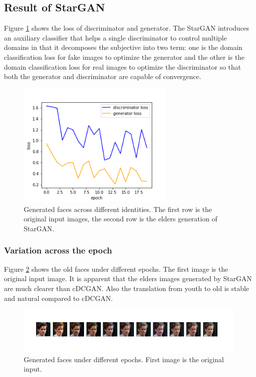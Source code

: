 \documentclass{article}
\begin{document}
\subsection{Result of StarGAN}

Figure \ref{stargan_loss} shows the loss of discriminator and generator. The StarGAN \cite{DBLP:journals/corr/abs-1711-09020} introduces an auxiliary classifier that helps a single discriminator to control multiple domains in that it decomposes the subjective into two term: one is the domain classification loss for fake images to optimize the generator and the other is the domain classification loss for real images to optimize the discriminator so that both the generator and discriminator are capable of convergence.

\begin{figure}[H]
\begin{center}
  \centering
  \includegraphics[width=3in]{image/stargan_loss.png}
\end{center}
\caption{Generated faces across different identities. The first row is the original input images, the second row is the elders generation of StarGAN.}
\label{stargan_loss}
\end{figure}

\subsubsection{Variation across the epoch}

Figure \ref{stargan_same_identity} shows the old faces under different epochs. The first image is the original input image. It is apparent that the elders images generated by StarGAN are much clearer than cDCGAN. Also the translation from youth to old is stable and natural compared to cDCGAN.

\begin{figure}[H]
\begin{center}
  \centering
  \includegraphics[width=6in]{image/stargan_same_identity.png}
\end{center}
\caption{Generated faces under different epochs. First image is the original input.}
\label{stargan_same_identity}
\end{figure}
\end{document}

